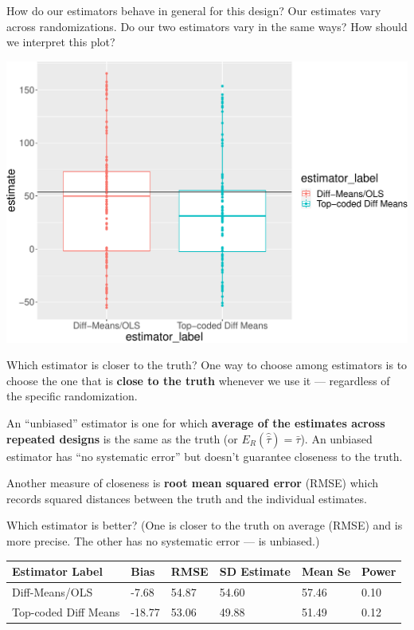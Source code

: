 \documentclass[
  ignorenonframetext,
]{beamer}
\begin{document}
\begin{frame}{How do our estimators behave in general for this design?}
\protect\hypertarget{how-do-our-estimators-behave-in-general-for-this-design-1}{}
Our estimates vary across randomizations. Do our two estimators vary in
the same ways? How should we interpret this plot?

\scriptsize

\includegraphics[width=.8\textwidth,]{figs/figsim_plot-1} \normalsize
\end{frame}

\begin{frame}{Which estimator is closer to the truth?}
\protect\hypertarget{which-estimator-is-closer-to-the-truth}{}
One way to choose among estimators is to choose the one that is
\textbf{close to the truth} whenever we use it --- regardless of the
specific randomization.

An ``unbiased'' estimator is one for which \textbf{average of the
estimates across repeated designs} is the same as the truth (or
\(E_R(\hat{\bar{\tau}})=\bar{\tau}\)). An unbiased estimator has ``no
systematic error'' but doesn't guarantee closeness to the truth.

Another measure of closeness is \textbf{root mean squared error} (RMSE)
which records squared distances between the truth and the individual
estimates.

Which estimator is better? (One is closer to the truth on average (RMSE)
and is more precise. The other has no systematic error --- is unbiased.)

\scriptsize
\begin{tabular}{l|l|l|l|l|l}
\hline
Estimator Label & Bias & RMSE & SD Estimate & Mean Se & Power\\
\hline
Diff-Means/OLS & -7.68 & 54.87 & 54.60 & 57.46 & 0.10\\
\hline
Top-coded Diff Means & -18.77 & 53.06 & 49.88 & 51.49 & 0.12\\
\hline
\end{tabular}

\normalsize
\end{frame}
\end{document}
